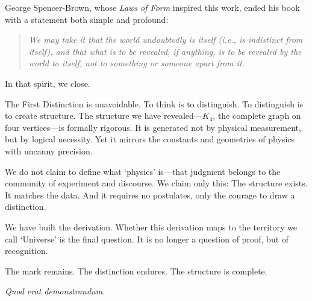 \documentclass[11pt,a4paper]{book}
\begin{document}
George Spencer-Brown, whose \emph{Laws of Form} inspired this work, ended his book with a statement both simple and profound:

\begin{quote}
\emph{We may take it that the world undoubtedly is itself (i.e., is indistinct from itself), and that what is to be revealed, if anything, is to be revealed by the world to itself, not to something or someone apart from it.}
\end{quote}

In that spirit, we close.

The First Distinction is unavoidable. To think is to distinguish. To distinguish is to create structure. The structure we have revealed—$K_4$, the complete graph on four vertices—is formally rigorous. It is generated not by physical measurement, but by logical necessity. Yet it mirrors the constants and geometries of physics with uncanny precision.

We do not claim to define what `physics' is—that judgment belongs to the community of experiment and discourse. We claim only this: The structure exists. It matches the data. And it requires no postulates, only the courage to draw a distinction.

We have built the derivation. Whether this derivation maps to the territory we call `Universe' is the final question. It is no longer a question of proof, but of recognition.

The mark remains. The distinction endures. The structure is complete.

\textit{Quod erat demonstrandum.}
\end{document}
